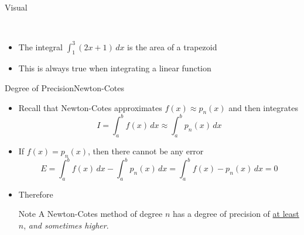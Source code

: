 \documentclass[10pt]{beamer}
\begin{document}
\begin{frame}{Visual}

\begin{figure}
    \centering
    \\
\end{figure}
    \begin{itemize}
        \item The integral $\int_1^3 (2x+1)\,dx$ is the area of a trapezoid
        \item This is always true when integrating a linear function
    \end{itemize}
\end{frame}
\begin{frame}{Degree of Precision}{Newton-Cotes}

\begin{itemize}
    \item Recall that Newton-Cotes approximates $f(x)\approx p_n(x)$ and then integrates
        $$I = \int_a^b f(x) \, dx \approx \int_a^b p_n(x)\, dx $$
        
    \item If $f(x) = p_n(x)$, then there cannot be any error 
        $$E = \int_a^b f(x) \, dx - \int_a^b p_n(x)\, dx = \int_a^b f(x)-p_n(x)\,dx = 0$$

    \item Therefore 

    \begin{block}{Note}
        A Newton-Cotes method of degree $n$ has a degree of precision of \underline{at least $n$}, \textit{and sometimes higher}.        
    \end{block}
    
\end{itemize}

\end{frame}
\end{document}

